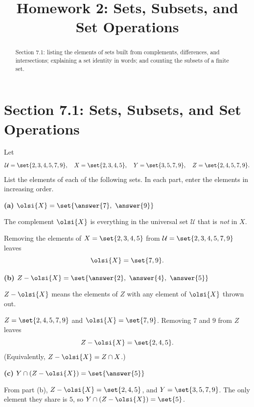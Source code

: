 \documentclass[12pt]{ximera}
\title{Homework 2: Sets, Subsets, and Set Operations}
\begin{document}
\begin{abstract}
Section 7.1: listing the elements of sets built from complements, differences, and
intersections; explaining a set identity in words; and counting the subsets of
a finite set.
\end{abstract}
\maketitle

\section*{Section 7.1: Sets, Subsets, and Set Operations}

\begin{problem}
Let
\[
\mathcal{U}=\set{2,3,4,5,7,9}, \quad
X=\set{2,3,4,5}, \quad
Y=\set{3,5,7,9}, \quad
Z=\set{2,4,5,7,9}.
\]
List the elements of each of the following sets. In each part, enter the elements in
increasing order.

\begin{prompt}
\textbf{(a)} $\olsi{X} = \set{\answer{7},\ \answer{9}}$

\begin{hint}
The complement $\olsi{X}$ is everything in the universal set $\mathcal{U}$ that is
\emph{not} in $X$.
\end{hint}

\begin{feedback}
Removing the elements of $X=\set{2,3,4,5}$ from $\mathcal{U}=\set{2,3,4,5,7,9}$ leaves
\[ \olsi{X} = \set{7,9}. \]
\end{feedback}
\end{prompt}

\begin{prompt}
\textbf{(b)} $Z - \olsi{X} = \set{\answer{2},\ \answer{4},\ \answer{5}}$

\begin{hint}
$Z-\olsi{X}$ means the elements of $Z$ with any element of $\olsi{X}$ thrown out.
\end{hint}

\begin{feedback}
$Z=\set{2,4,5,7,9}$ and $\olsi{X}=\set{7,9}$. Removing $7$ and $9$ from $Z$ leaves
\[ Z-\olsi{X} = \set{2,4,5}. \]
(Equivalently, $Z-\olsi{X}=Z\cap X$.)
\end{feedback}
\end{prompt}

\begin{prompt}
\textbf{(c)} $Y\cap\left(Z - \olsi{X}\right) = \set{\answer{5}}$

\begin{feedback}
From part (b), $Z-\olsi{X}=\set{2,4,5}$, and $Y=\set{3,5,7,9}$. The only element they
share is $5$, so $Y\cap\left(Z-\olsi{X}\right)=\set{5}$.
\end{feedback}
\end{prompt}
\end{problem}
\end{document}

